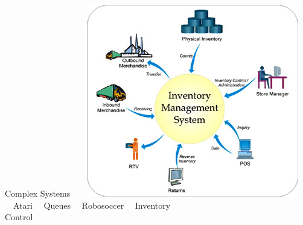 \documentclass[10pt]{beamer}
\begin{document}
\begin{frame}[fragile]{Complex Systems}
$\mbox{ }$$\mbox{ }$
\includegraphics[scale=0.125]{invent.jpeg}
$\mbox{ }$\\
$\mbox{ }$
\quad Atari\quad\quad\quad\quad
$\mbox{ }$
Queues\quad\quad\quad\quad
$\mbox{ }$
 Robosoccer\quad\quad
$\mbox{ }$
Inventory
$\mbox{ }$\\
\quad\quad\quad\quad\quad\quad\quad
\quad\quad\quad\quad\quad\quad\quad
\quad\quad\quad\quad\quad\quad\quad
\quad\quad\quad
Control


\end{frame}
\end{document}
